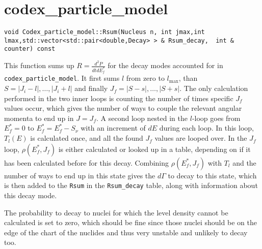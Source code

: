 \lstset{language=C++ ,basicstyle=\footnotesize, breaklines=true, %
}

\section{codex\_particle\_model}

\begin{lstlisting}
void Codex_particle_model::Rsum(Nucleus n, int jmax,int lmax,std::vector<std::pair<double,Decay> > & Rsum_decay,  int & counter) const
\end{lstlisting}
This function sums up $R=\frac{d^2 P}{dt dE_f^*}$ for the decay modes accounted for in \texttt{codex\_particle\_model}.
It first sums $l$ from zero to $l_\text{max}$, than $S=|J_i-l|,\dots , |J_i+l|$ and finally $J_f =|S-s|,\dots , |S+s|$. The only calculation performed in the two inner loops is counting the number of times specific $J_f$ values occur, which gives the number of ways to couple the relevant angular momenta to end up in $J=J_f$.
A second loop nested in the $l$-loop goes from $E_f^*=0$ to $E_f^* = E_f^* - S_\nu$ with an increment of $dE$ during each loop. In this loop, $T_l(E)$ is calculated once, and all the found $J_f$ values are looped over. In the $J_f$ loop, $\rho(E_f^*,J_f)$ is either calculated or looked up in a table, depending on if it has been calculated before for this decay. Combining $\rho(E_f^*,J_f)$ with $T_l$ and the number of ways to end up in this state gives the $d\Gamma$ to decay to this state, which is then added to the \texttt{Rsum} in the \texttt{Rsum\_decay} table, along with information about this decay mode.

The probability to decay to nuclei for which the level density cannot be calculated is set to zero, which should be fine since those nuclei should be on the edge of the chart of the nuclides and thus very unstable and unlikely to decay too.